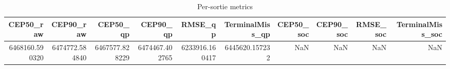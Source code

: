 \begin{table}[t]
\centering
\begin{tabular}{rrrrrrrrrr}
\toprule
CEP50_raw & CEP90_raw & CEP50_qp & CEP90_qp & RMSE_qp & TerminalMiss_qp & CEP50_soc & CEP90_soc & RMSE_soc & TerminalMiss_soc \\
\midrule
6468160.590320 & 6474772.584840 & 6467577.828229 & 6474467.402765 & 6233916.160417 & 6445620.157232 & NaN & NaN & NaN & NaN \\
\bottomrule
\end{tabular}
\caption{Per-sortie metrics}
\label{tab:per_sortie}
\end{table}
